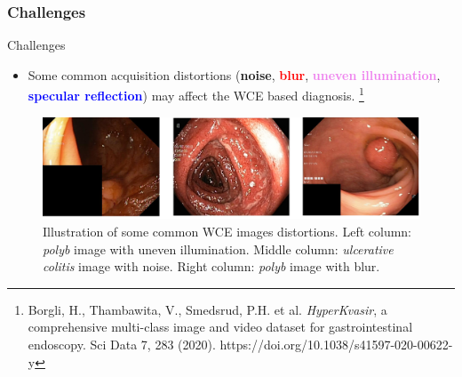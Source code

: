 \documentclass{libs/ufc_format}
\begin{document}
\subsubsection{Challenges}
\begin{frame}{Challenges}
    \begin{itemize}
        \item Some common acquisition distortions (\textbf{noise}, \textcolor{red}{\textbf{blur}}, \textcolor{violet}{\textbf{uneven illumination}}, \textcolor{blue}{\textbf{specular reflection}}) may affect the WCE based diagnosis.         \footnote[frame]{\tiny Borgli, H., Thambawita, V., Smedsrud, P.H. et al. \textit{HyperKvasir}, a comprehensive multi-class image and video dataset for gastrointestinal endoscopy. Sci Data 7, 283 (2020). https://doi.org/10.1038/s41597-020-00622-y}
    \end{itemize}


    \begin{figure}
        \centering
        \includegraphics[scale=0.13]{libs/examdis2.png}
        \caption{Illustration of some common WCE images distortions. Left column: \textit{polyb} image with uneven illumination. Middle column: \textit{ulcerative colitis} image with noise. Right column: \textit{polyb} image with blur.}
        \label{fig:endoscopy}
    \end{figure}

\end{frame}
\end{document}
